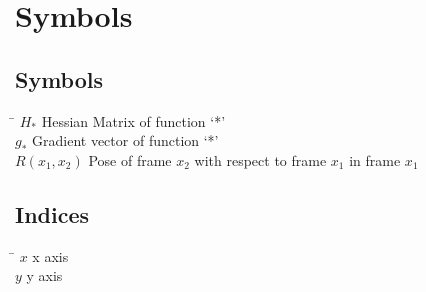 \chapter*{Symbols}
\label{sec:symbols}

\section*{Symbols}

\begin{tabbing}
 \hspace*{1.6cm} \= \kill
  $H_*$    \> Hessian Matrix of function `*'\\[0.5ex] 					
  $g_*$                     \> Gradient vector of function `*'\\[0.5ex]										
  $R(x_1, x_2)$              \> Pose of frame $x_2$ with respect to frame $x_1$ in frame $x_1$ \\[0.5ex]   		
\end{tabbing}

\section*{Indices}
\begin{tabbing}
 \hspace*{1.6cm}  \= \kill
 $x$ \> x axis \\[0.5ex]
 $y$ \> y axis \\[0.5ex]
\end{tabbing}


